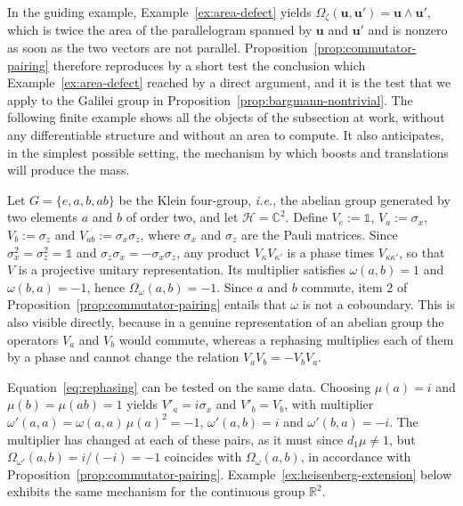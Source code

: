 In the guiding example, Example~\ref{ex:area-defect} yields $\Omega_\zeta(\mathbf{u},\mathbf{u}')=\mathbf{u}\wedge\mathbf{u}'$, which is twice the area of the parallelogram spanned by $\mathbf{u}$ and $\mathbf{u}'$ and is nonzero as soon as the two vectors are not parallel. Proposition~\ref{prop:commutator-pairing} therefore reproduces by a short test the conclusion which Example~\ref{ex:area-defect} reached by a direct argument, and it is the test that we apply to the Galilei group in Proposition~\ref{prop:bargmann-nontrivial}. The following finite example shows all the objects of the subsection at work, without any differentiable structure and without an area to compute. It also anticipates, in the simplest possible setting, the mechanism by which boosts and translations will produce the mass.

\begin{example}\label{ex:klein-pauli}
	Let $G=\{e,a,b,ab\}$ be the Klein four-group, \textit{i.e.}, the abelian group generated by two elements $a$ and $b$ of order two, and let $\mathcal{H}=\mathbb{C}^2$. Define $V_e:=\mathbb{1}$, $V_a:=\sigma_x$, $V_b:=\sigma_z$ and $V_{ab}:=\sigma_x\sigma_z$, where $\sigma_x$ and $\sigma_z$ are the Pauli matrices. Since $\sigma_x^2=\sigma_z^2=\mathbb{1}$ and $\sigma_z\sigma_x=-\sigma_x\sigma_z$, any product $V_\kappa V_{\kappa'}$ is a phase times $V_{\kappa\kappa'}$, so that $V$ is a projective unitary representation. Its multiplier satisfies $\omega(a,b)=1$ and $\omega(b,a)=-1$, hence $\Omega_\omega(a,b)=-1$. Since $a$ and $b$ commute, item 2 of Proposition~\ref{prop:commutator-pairing} entails that $\omega$ is not a coboundary. This is also visible directly, because in a genuine representation of an abelian group the operators $V_a$ and $V_b$ would commute, whereas a rephasing multiplies each of them by a phase and cannot change the relation $V_aV_b=-V_bV_a$.
	
	Equation~\eqref{eq:rephasing} can be tested on the same data. Choosing $\mu(a)=i$ and $\mu(b)=\mu(ab)=1$ yields $V'_a=i\sigma_x$ and $V'_b=V_b$, with multiplier $\omega'(a,a)=\omega(a,a)\,\mu(a)^2=-1$, $\omega'(a,b)=i$ and $\omega'(b,a)=-i$. The multiplier has changed at each of these pairs, as it must since $d_1\mu\neq1$, but $\Omega_{\omega'}(a,b)=i/(-i)=-1$ coincides with $\Omega_\omega(a,b)$, in accordance with Proposition~\ref{prop:commutator-pairing}. Example~\ref{ex:heisenberg-extension} below exhibits the same mechanism for the continuous group $\mathbb{R}^2$.
\end{example}
